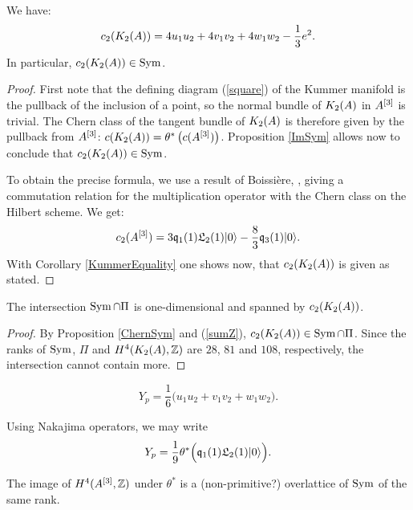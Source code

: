 \begin{proposition} \label{ChernSym}
We have:
\begin{equation}
c_2(K_{ 2 }( A ))= 4 u_1u_2 + 4v_1v_2 + 4 w_1 w_2 - \frac{1}{3} e^2. 
\end{equation}
In particular, $c_2(K_{ 2 }( A ))\in \operatorname{Sym} $.
\end{proposition}
\begin{proof}
First note that the defining diagram (\ref{square}) of the Kummer manifold is the pullback of the inclusion of a point, so the normal bundle of $K_{ 2 }( A )$ in $A^{[3]}$ is trivial. The Chern class of the tangent bundle of $K_{ 2 }( A )$ is therefore given by the pullback from $A^{[3]}$: $c(K_{ 2 }( A )) = \theta^*\left(c(A^{[3]})\right)$. Proposition \ref{ImSym} allows now to conclude that $c_2(K_{ 2 }( A ))\in \operatorname{Sym}$.

To obtain the precise formula, we use a result of Boissi\`ere, \cite[Lemma 3.12]{Boissiere}, giving a commutation relation for the multiplication operator with the Chern class on the Hilbert scheme. We get:
$$
c_2(A^{[3]}) = 3\mathfrak{q}_1(1)\mathfrak L_2(1)|0\rangle - \frac{8}{3} \mathfrak{q}_3(1)|0\rangle.
$$
With Corollary \ref{KummerEquality} one shows now, that $c_2(K_{ 2 }( A ))$ is given as stated.
\end{proof}


\begin{corollary}\label{Pi'}
The intersection $\operatorname{Sym}\cap \Pi$ is one-dimensional and spanned by $c_2(K_{ 2 }( A ))$. 
\end{corollary}
\begin{proof}
By Proposition \ref{ChernSym} and (\ref{sumZ}), $c_2(K_{ 2 }( A ))\in \operatorname{Sym}\cap \Pi$. Since the ranks of $\operatorname{Sym}$, $\Pi$ and $H^4(K_{ 2 }( A ),\mathbb{Z})$ are $28$, $81$ and $108$, respectively, the intersection cannot contain more.
\end{proof}

\begin{corollary}\label{Classuvw}
\begin{equation} \label{YSym}
Y_p =  \frac{1}{6}\Big(u_1u_2 + v_1v_2 +  w_1 w_2 \Big).
\end{equation}
\end{corollary}
\begin{remark}
Using Nakajima operators, we may write
\begin{gather}
Y_p = \frac{1}{9} \theta^*\Big( \mathfrak{q}_1(1)\mathfrak L_2(1) |0\rangle \Big).
\end{gather}

\end{remark}

\begin{proposition}
The image of $H^4(A^{[3]},\mathbb{Z})$ under $\theta^*$ is a (non-primitive?) overlattice of $\operatorname{Sym}$ of the same rank.
\end{proposition}

